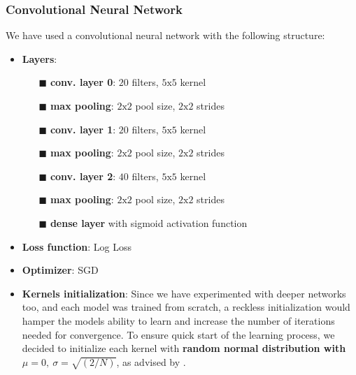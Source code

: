         \subsubsection{Convolutional Neural Network}
        We have used a convolutional neural network with the following structure:
        \begin{itemize}
            \item \textbf{Layers}:
            \begin{itemize}
            \item[$\blacksquare$] \textbf{conv. layer 0}: $20$ filters, $5 \text{x} 5$ kernel
            \item[$\blacksquare$] \textbf{max pooling}: $2 \text{x} 2$ pool size, $2 \text{x} 2$ strides
            \item[$\blacksquare$] \textbf{conv. layer 1}: $20$ filters, $5 \text{x} 5$ kernel
            \item[$\blacksquare$] \textbf{max pooling}: $2 \text{x} 2$ pool size, $2 \text{x} 2$ strides
            \item[$\blacksquare$] \textbf{conv. layer 2}: $40$ filters, $5 \text{x} 5$ kernel
            \item[$\blacksquare$] \textbf{max pooling}: $2 \text{x} 2$ pool size, $2 \text{x} 2$ strides
            \item[$\blacksquare$] \textbf{dense layer} with sigmoid activation function
            \end{itemize}
            \item \textbf{Loss function}: Log Loss
            \item \textbf{Optimizer}: SGD
            \item \textbf{Kernels initialization}: Since we have experimented with deeper
            networks too, and each model was trained from scratch, a reckless initialization
            would hamper the models ability to learn and increase the number of
            iterations needed for convergence. To ensure quick start of the learning
            process, we decided to initialize each kernel with \textbf{random normal
            distribution with $\mu = 0,\ \sigma = \sqrt{(2 / N)}$}, as advised by
            \citeauthor{initialization}.
        \end{itemize}



